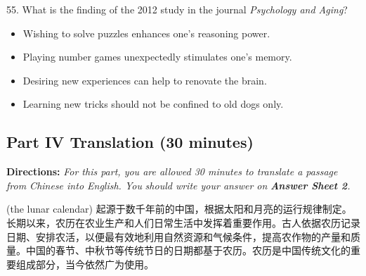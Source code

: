\documentclass[UTF8,11pt]{ctexart}
\begin{document}
55. What is the finding of the 2012 study in the journal \textit{Psychology and Aging}?


\begin{itemize}[leftmargin=2em,itemsep=.2em,topsep=.4em]\item[A.] Wishing to solve puzzles enhances one’s reasoning power.
\item[B.] Playing number games unexpectedly stimulates one’s memory.
\item[C.] Desiring new experiences can help to renovate the brain.
\item[D.] Learning new tricks should not be confined to old dogs only.
\end{itemize}

\subsection*{\textbf{Part IV Translation (30 minutes)}}


\textbf{Directions: }\textit{For this part, you are allowed 30 minutes to translate a passage from Chinese into English. You} \textit{should write your answer on }\textbf{\textit{Answer Sheet 2}}\textit{.}


(the lunar calendar) 起源于数千年前的中国，根据太阳和月亮的运行规律制定。长期以来，农历在农业生产和人们日常生活中发挥着重要作用。古人依据农历记录日期、安排农活，以便最有效地利用自然资源和气候条件，提高农作物的产量和质量。中国的春节、中秋节等传统节日的日期都基于农历。农历是中国传统文化的重要组成部分，当今依然广为使用。
\end{document}
